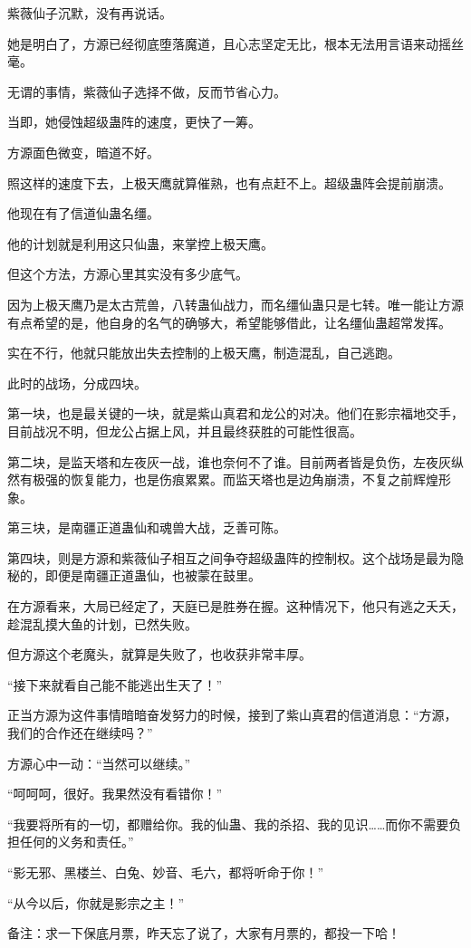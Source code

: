 \begin{this_body}
紫薇仙子沉默，没有再说话。

她是明白了，方源已经彻底堕落魔道，且心志坚定无比，根本无法用言语来动摇丝毫。

无谓的事情，紫薇仙子选择不做，反而节省心力。

当即，她侵蚀超级蛊阵的速度，更快了一筹。

方源面色微变，暗道不好。

照这样的速度下去，上极天鹰就算催熟，也有点赶不上。超级蛊阵会提前崩溃。

他现在有了信道仙蛊名缰。

他的计划就是利用这只仙蛊，来掌控上极天鹰。

但这个方法，方源心里其实没有多少底气。

因为上极天鹰乃是太古荒兽，八转蛊仙战力，而名缰仙蛊只是七转。唯一能让方源有点希望的是，他自身的名气的确够大，希望能够借此，让名缰仙蛊超常发挥。

实在不行，他就只能放出失去控制的上极天鹰，制造混乱，自己逃跑。

此时的战场，分成四块。

第一块，也是最关键的一块，就是紫山真君和龙公的对决。他们在影宗福地交手，目前战况不明，但龙公占据上风，并且最终获胜的可能性很高。

第二块，是监天塔和左夜灰一战，谁也奈何不了谁。目前两者皆是负伤，左夜灰纵然有极强的恢复能力，也是伤痕累累。而监天塔也是边角崩溃，不复之前辉煌形象。

第三块，是南疆正道蛊仙和魂兽大战，乏善可陈。

第四块，则是方源和紫薇仙子相互之间争夺超级蛊阵的控制权。这个战场是最为隐秘的，即便是南疆正道蛊仙，也被蒙在鼓里。

在方源看来，大局已经定了，天庭已是胜券在握。这种情况下，他只有逃之夭夭，趁混乱摸大鱼的计划，已然失败。

但方源这个老魔头，就算是失败了，也收获非常丰厚。

“接下来就看自己能不能逃出生天了！”

正当方源为这件事情暗暗奋发努力的时候，接到了紫山真君的信道消息：“方源，我们的合作还在继续吗？”

方源心中一动：“当然可以继续。”

“呵呵呵，很好。我果然没有看错你！”

“我要将所有的一切，都赠给你。我的仙蛊、我的杀招、我的见识……而你不需要负担任何的义务和责任。”

“影无邪、黑楼兰、白兔、妙音、毛六，都将听命于你！”

“从今以后，你就是影宗之主！”

备注：求一下保底月票，昨天忘了说了，大家有月票的，都投一下哈！

\end{this_body}

